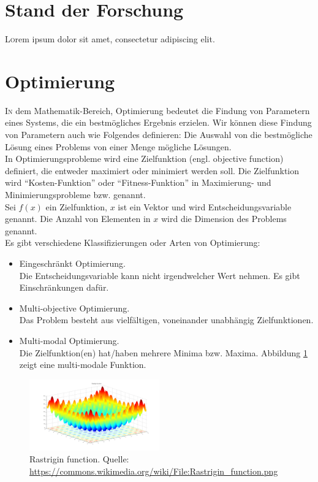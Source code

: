 \documentclass[twoside,twocolumn]{article}
\begin{document}
\section{Stand der Forschung}

\lettrine[nindent=0em,lines=3]{L} orem ipsum dolor sit amet, consectetur adipiscing elit.
\blindtext %


\section{Optimierung}

\lettrine[nindent=0em,lines=3]{I} n dem Mathematik-Bereich, Optimierung bedeutet die Findung von Parametern eines Systems, die ein bestmögliches Ergebnis erzielen. \cite{wiki_optimierung} Wir können diese Findung von Parametern auch wie Folgendes definieren: Die Auswahl von die bestmögliche Lösung eines Problems von einer Menge mögliche Lösungen.\\
In Optimierungsprobleme wird eine Zielfunktion (engl. objective function) definiert, die entweder maximiert oder minimiert werden soll. Die Zielfunktion wird ``Kosten-Funktion'' oder ``Fitness-Funktion'' in Maximierung- und Minimierungsprobleme bzw. genannt.\\
Sei $f(x)$ ein Zielfunktion, $x$ ist ein Vektor und wird Entscheidungsvariable genannt. Die Anzahl von Elementen in $x$ wird die Dimension des Problems genannt.\\
Es gibt verschiedene Klassifizierungen oder Arten von Optimierung:

\begin{itemize}
\item{Eingeschränkt Optimierung.}\\
Die Entscheidungsvariable kann nicht irgendwelcher Wert nehmen. Es gibt Einschränkungen dafür.\\
\item{Multi-objective Optimierung.}\\
Das Problem besteht aus vielfältigen, voneinander unabhängig Zielfunktionen.\\
\item{Multi-modal Optimierung.}\\
Die Zielfunktion(en) hat/haben mehrere Minima bzw. Maxima. Abbildung \ref{fig:rastrigin} zeigt eine multi-modale Funktion.
\end{itemize}

\begin{figure}[h]
\caption{ Rastrigin function. Quelle: \url{https://commons.wikimedia.org/wiki/File:Rastrigin_function.png}}
\label{fig:rastrigin}
\centering
\includegraphics[width=0.5\textwidth]{images/rastrigin_function.png}
\end{figure}
\end{document}
